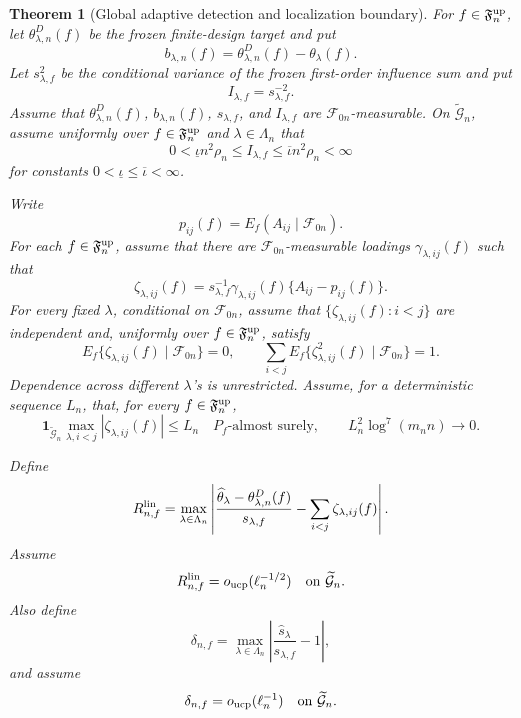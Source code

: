 \documentclass[11pt]{article}
\newtheorem{theorem}{Theorem}[section]
\theoremstyle{definition}
\newcommand{\1}{\mathbf 1}\newcommand{\op}{\operatorname}
\begin{document}
\begin{theorem}[Global adaptive detection and localization boundary]
For \(f\in\mathfrak F_n^{\rm up}\), let
\(\theta_{\lambda,n}^{D}(f)\) be the frozen finite-design target and
put
\[
b_{\lambda,n}(f)
=
\theta_{\lambda,n}^{D}(f)-\theta_\lambda(f).
\]
Let \(s_{\lambda,f}^2\) be the conditional variance of the frozen
first-order influence sum and put
\[
I_{\lambda,f}=s_{\lambda,f}^{-2}.
\]
Assume that
\(\theta_{\lambda,n}^{D}(f)\), \(b_{\lambda,n}(f)\),
\(s_{\lambda,f}\), and \(I_{\lambda,f}\) are
\(\mathcal F_{0n}\)-measurable.  On
\(\widetilde{\mathcal G}_n\), assume uniformly over
\(f\in\mathfrak F_n^{\rm up}\) and
\(\lambda\in\Lambda_n\) that
\begin{equation}
0<\underline\iota n^2\rho_n
\le
I_{\lambda,f}
\le
\overline\iota n^2\rho_n
<\infty
\label{eq:t3-7}
\end{equation}
for constants
\(0<\underline\iota\le\overline\iota<\infty\).

Write
\[
p_{ij}(f)
=
E_f(A_{ij}\mid\mathcal F_{0n}).
\]
For each \(f\in\mathfrak F_n^{\rm up}\), assume that there are
\(\mathcal F_{0n}\)-measurable loadings
\(\gamma_{\lambda,ij}(f)\) such that
\[
\zeta_{\lambda,ij}(f)
=
s_{\lambda,f}^{-1}
\gamma_{\lambda,ij}(f)
\{A_{ij}-p_{ij}(f)\}.
\]
For every fixed \(\lambda\), conditional on \(\mathcal F_{0n}\),
assume that
\(\{\zeta_{\lambda,ij}(f):i<j\}\) are independent and, uniformly over
\(f\in\mathfrak F_n^{\rm up}\), satisfy
\begin{equation}
E_f\{\zeta_{\lambda,ij}(f)\mid\mathcal F_{0n}\}=0,
\qquad
\sum_{i<j}
E_f\{\zeta_{\lambda,ij}^2(f)\mid\mathcal F_{0n}\}=1.
\label{eq:t3-8}
\end{equation}
Dependence across different \(\lambda\)'s is unrestricted.  Assume,
for a deterministic sequence \(L_n\), that, for every
\(f\in\mathfrak F_n^{\rm up}\),
\begin{equation}
\mathbf 1_{\widetilde{\mathcal G}_n}
\max_{\lambda,i<j}
|\zeta_{\lambda,ij}(f)|
\le L_n
\quad P_f\text{-almost surely},
\qquad
L_n^2\log^7(m_n n)\to0.
\label{eq:t3-9}
\end{equation}

Define
\[
R_{n,f}^{\rm lin}
=
\max_{\lambda\in\Lambda_n}
\left|
\frac{
\widehat\theta_\lambda-\theta_{\lambda,n}^{D}(f)
}{
s_{\lambda,f}
}
-
\sum_{i<j}\zeta_{\lambda,ij}(f)
\right|.
\]
Assume
\begin{equation}
R_{n,f}^{\rm lin}
=
o_{\rm ucp}(\ell_n^{-1/2})
\quad
\text{on }\widetilde{\mathcal G}_n.
\label{eq:t3-10}
\end{equation}
Also define
\[
\delta_{n,f}
=
\max_{\lambda\in\Lambda_n}
\left|
\frac{\widehat s_\lambda}{s_{\lambda,f}}-1
\right|,
\]
and assume
\begin{equation}
\delta_{n,f}
=
o_{\rm ucp}(\ell_n^{-1})
\quad
\text{on }\widetilde{\mathcal G}_n.
\label{eq:t3-11}
\end{equation}


\end{theorem}
\end{document}
